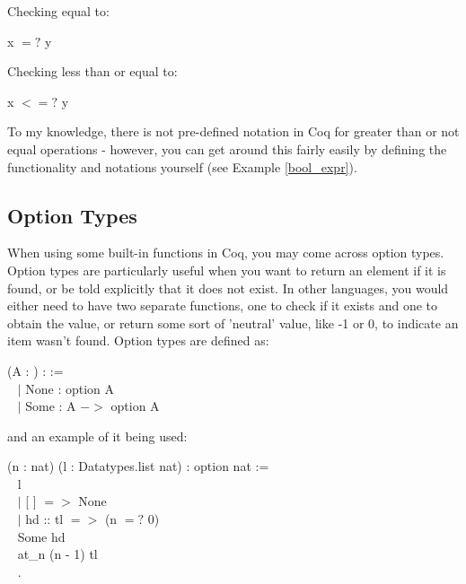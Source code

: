 Checking equal to:
\begin{code}
	x $=?$ y
\end{code}

Checking less than or equal to:
\begin{code}
	x $<=?$ y
\end{code}

\noindent
To my knowledge, there is not pre-defined notation in Coq for greater than or not equal operations - however, you can get around this fairly easily by defining the functionality and notations yourself  (see Example \ref{bool_expr}).






\subsection{Option Types} \label{opt_ty}
When using some built-in functions in Coq, you may come across option types. 
Option types are particularly useful when you want to return an element if it is found, or be told explicitly that it does not exist.
In other languages, you would either need to have two separate functions, one to check if it exists and one to obtain the value, or return some sort of 'neutral' value, like -1 or 0, to indicate an item wasn't found.
Option types are defined as: 

\begin{code} 
	\Inductive {} (A : \Type) : \Type :=	\\ \-\ \quad
	$\mid$ None : option A					\\ \-\ \quad
	$\mid$ Some : A $->$ option A
\end{code}

and an example of it being used:

\begin{code}
	\Fixpoint {} (n : nat) (l : Datatypes.list nat) : option nat :=	\\ \-\ \quad
	  \match l \with 										\\ \-\ \qquad
	  $\mid$ [ ] $=>$ None								\\ \-\ \qquad
	  $\mid$ hd :: tl $=>$  \If (n $=?$ 0)			\\ \-\ \qquad\qquad\qquad\quad
		    \Then Some hd					\\ \-\ \qquad\qquad\qquad\quad
		    \Else at\_n (n - 1) tl							\\ \-\ \qquad
	  \End.
\end{code}


